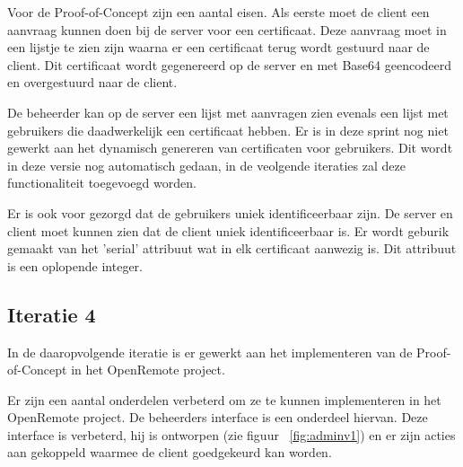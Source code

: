 \documentclass[]{article}
\begin{document}
Voor de Proof-of-Concept zijn een aantal eisen. Als eerste moet de client
een aanvraag kunnen doen bij de server voor een certificaat. Deze aanvraag
moet in een lijstje te zien zijn waarna er een certificaat terug wordt
gestuurd naar de client. Dit certificaat wordt gegenereerd op de server en
met Base64 geencodeerd en overgestuurd naar de client.

De beheerder kan op de server een lijst met aanvragen zien evenals een
lijst met gebruikers die daadwerkelijk een certificaat hebben. Er is in deze
sprint nog niet gewerkt aan het dynamisch genereren van certificaten voor
gebruikers. Dit wordt in deze versie nog automatisch gedaan, in de veolgende
iteraties zal deze functionaliteit toegevoegd worden.

Er is ook voor gezorgd dat de gebruikers uniek identificeerbaar zijn. De server
en client moet kunnen zien dat de client uniek identificeerbaar is. Er wordt
geburik gemaakt van het 'serial' attribuut wat in elk certificaat aanwezig is.
Dit attribuut is een oplopende integer.

\subsection{Iteratie 4}
In de daaropvolgende iteratie is er gewerkt aan het implementeren van de
Proof-of-Concept in het OpenRemote project.

Er zijn een aantal onderdelen verbeterd om ze te kunnen implementeren in het
OpenRemote project. De beheerders
interface is een onderdeel hiervan. Deze interface is verbeterd, hij is
ontworpen (zie figuur ~\ref{fig:adminv1}) en er zijn acties aan gekoppeld 
waarmee de client goedgekeurd kan worden.
\end{document}
